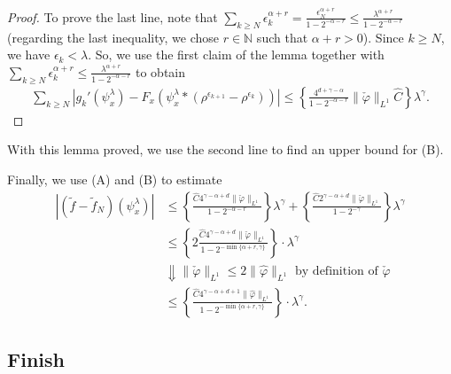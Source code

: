 \begin{itemize}
\begin{proof}
        To prove the last line, note that \(\sum\limits_{k \geq N} \epsilon_k^{\alpha + r} = \frac{\epsilon_N^{\alpha+ r}}{1 - 2^{-\alpha - r}} \leq \frac{\lambda^{\alpha + r}}{1 - 2^{- \alpha - r}}\)  (regarding the last inequality, we chose \(r \in \mathbb{N}\) such that  \(\alpha + r > 0\)). Since \(k \geq N\), we have \(\epsilon_k < \lambda\). So, we use the first claim of the lemma together with \(\sum\limits_{k \geq N} \epsilon_k^{\alpha + r} \leq \frac{\lambda^{\alpha + r}}{1 - 2^{- \alpha - r}}\) to obtain
        \begin{align*}
            \sum_{k \geq N} |g_k'(\psi^\lambda_x) - F_x(\psi^\lambda_x * (\rho^{\epsilon_{k+1}} - \rho^{\epsilon_k}))| \leq \left\{\frac{4^{d + \gamma - \alpha}}{1-2^{-\alpha - r}} \lVert \check \varphi \rVert_{L^1} \hat C \right\} \lambda^{\gamma}. 
        \end{align*} 
    \end{proof}
    With this lemma proved, we use the second line to find an upper bound for (B).
\end{itemize}

Finally, we use (A) and (B) to estimate
\begin{align*}
    |(\tilde f - \tilde f_N) (\psi^\lambda_x)| 
    &\leq
    \left \{ \frac{\hat C 4^{\gamma - \alpha + d} \lVert \check \varphi \rVert_{L^1} }{1-2^{-\alpha - r}} \right \} \lambda^{\gamma} + \left\{\frac{\hat C  2^{\gamma - \alpha + d} \lVert \check \varphi \rVert_{L^1}}{1-2^{-\gamma}}\right\} \lambda^{\gamma} \\
    &\leq \left\{ 2 \frac{\hat C 4^{\gamma - \alpha + d} \lVert \check \varphi \rVert_{L^1} }{1-2^{-\min\{\alpha + r, \gamma\}}} \right\}\cdot \lambda^{\gamma} \\
    &\Downarrow \text{\(\lVert \check \varphi \rVert_{L^1} \leq 2\lVert \hat \varphi \rVert_{L^1} \) by definition of \(\check \varphi\)} \\
    &\leq \left\{ \frac{\hat C 4^{\gamma - \alpha + d + 1} \lVert \hat \varphi \rVert_{L^1} }{1-2^{-\min\{\alpha + r, \gamma\}}} \right\}\cdot \lambda^{\gamma}.
\end{align*}

\subsection*{Finish}

